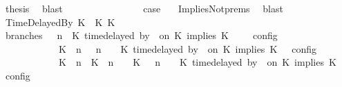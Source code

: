 \begin{isabellebody}
\ {\isacharquery}thesis\ \isamarkupfalse%
\ blast\isanewline
\ \ \ \ \ \ \isamarkupfalse%
\isanewline
\ \ \ \ \ \ \isamarkupfalse%
\ \isamarkupfalse%
\ {\isacharquery}case\ \ \isamarkupfalse%
\ ImpliesNot{\isachardot}prems{\isacharparenleft}{}{\isacharparenright}\ \isamarkupfalse%
\ blast\isanewline
\ \ \isamarkupfalse%
\isanewline
\ \ \ \ \isamarkupfalse%
\ {\isacharparenleft}TimeDelayedBy\ K\ {\isasymdelta}{\isasymtau}\ K\ K\isanewline
\ \ \ \ \ \ \isamarkupfalse%
\ branches{\isacharcolon}\ {\isacartoucheopen}{\isasymlbrakk}\ {\isasymGamma}{\isacharcomma}\ n\ {\isasymturnstile}\ {\isacharparenleft}{\isacharparenleft}K\ time{\isacharminus}delayed\ by\ {\isasymdelta}{\isasymtau}\ on\ K\ implies\ K\ {\isacharhash}\ {\isasymPsi}{\isacharparenright}\ {\isasymtriangleright}\ {\isasymPhi}\ {\isasymrbrakk}\isactrlsub c\isactrlsub o\isactrlsub n\isactrlsub f\isactrlsub i\isactrlsub g\isanewline
\ \ \ \ \ \ \ \ \ \ {\isacharequal}\ {\isasymlbrakk}\ {\isacharparenleft}{\isacharparenleft}K\ {\isasymnot}{\isasymUp}\ n{\isacharparenright}\ {\isacharhash}\ {\isasymGamma}{\isacharparenright}{\isacharcomma}\ n\ {\isasymturnstile}\ {\isasymPsi}\ {\isasymtriangleright}\ {\isacharparenleft}{\isacharparenleft}K\ time{\isacharminus}delayed\ by\ {\isasymdelta}{\isasymtau}\ on\ K\ implies\ K\ {\isacharhash}\ {\isasymPhi}{\isacharparenright}\ {\isasymrbrakk}\isactrlsub c\isactrlsub o\isactrlsub n\isactrlsub f\isactrlsub i\isactrlsub g\isanewline
\ \ \ \ \ \ \ \ \ \ {\isasymunion}\ {\isasymlbrakk}\ {\isacharparenleft}{\isacharparenleft}K\ {\isasymUp}\ n{\isacharparenright}\ {\isacharhash}\ {\isacharparenleft}K\ {\isacharat}\ n\ {\isasymoplus}\ {\isasymdelta}{\isasymtau}\ {\isasymRightarrow}\ K\ {\isacharhash}\ {\isasymGamma}{\isacharparenright}{\isacharcomma}\ n\ {\isasymturnstile}\ {\isasymPsi}\ {\isasymtriangleright}\ {\isacharparenleft}{\isacharparenleft}K\ time{\isacharminus}delayed\ by\ {\isasymdelta}{\isasymtau}\ on\ K\ implies\ K\ {\isacharhash}\ {\isasymPhi}{\isacharparenright}\ {\isasymrbrakk}\isactrlsub c\isactrlsub o\isactrlsub n\isactrlsub f\isactrlsub i\isactrlsub g{\isacartoucheclose}\isanewline

\end{isabellebody}

